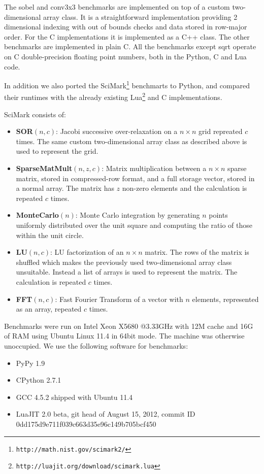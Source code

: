 \documentclass[preprint]{sigplanconf}
\begin{document}
The sobel and conv3x3 benchmarks are implemented
on top of a custom two-dimensional array class.
It is
a straightforward implementation providing 2 dimensional
indexing with out of bounds checks and 
data stored in row-major order.
For the C implementations it is
implemented as a C++ class. The other benchmarks are implemented in
plain C. All the benchmarks except sqrt operate on C double-precision floating
point numbers, both in the Python, C and Lua code.

In addition we also ported the 
SciMark\footnote{\texttt{http://math.nist.gov/scimark2/}} benchmarts to Python, and compared
their runtimes with the already existing
Lua\footnote{\texttt{http://luajit.org/download/scimark.lua}} and C
implementations.

SciMark consists of:

\begin{itemize}
\item {\bf SOR}$\left(n, c\right)$: Jacobi successive over-relaxation on a $n\times n$ grid repreated $c$ times.
The same custom two-dimensional array class as described above is used to represent
the grid.
\item {\bf SparseMatMult}$\left(n, z, c\right)$: Matrix multiplication between a $n\times n$ sparse matrix,
stored in compressed-row format, and a full storage vector, stored in a normal array. The matrix has $z$ non-zero elements and the calculation is repeated $c$ times.
\item {\bf MonteCarlo}$\left(n\right)$: Monte Carlo integration by generating $n$ points uniformly distributed over the unit square and computing the ratio of those within the unit circle.
\item {\bf LU}$\left(n, c\right)$: LU factorization of an $n \times n$ matrix. The rows of the matrix is shuffled which makes the previously used two-dimensional array class unsuitable. Instead a list of arrays is used to represent the matrix. The calculation is repeated $c$ times.
\item {\bf FFT}$\left(n, c\right)$: Fast Fourier Transform of a vector with $n$ elements, represented as an array, repeated $c$ times.
\end{itemize}

Benchmarks were run on Intel Xeon X5680 @3.33GHz with 12M cache and 16G of RAM
using Ubuntu Linux 11.4 in 64bit mode.
The machine was otherwise unoccupied. We use the following software
for benchmarks:

\begin{itemize}
\item PyPy 1.9
\item CPython 2.7.1
\item GCC 4.5.2 shipped with Ubuntu 11.4
\item LuaJIT 2.0 beta, git head of August 15, 2012, commit ID 0dd175d9e711f039c663d35e96c149b705bcf450
\end{itemize}
\end{document}
